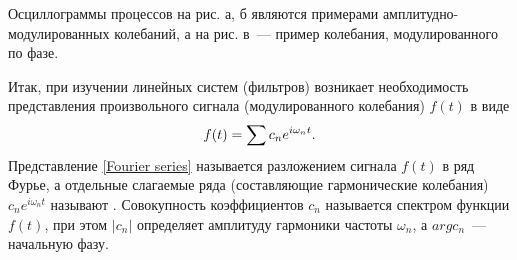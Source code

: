 




%

Осциллограммы процессов на рис. а, б являются примерами амплиту\-дно-модулированных колебаний, а на рис. в~--- пример
колебания, модулированного по фазе.



Итак, при изучении линейных систем (фильтров) возникает необходимость представления произвольного сигнала
(модулированного колебания) $f(t)$ в виде
\begin{equation}
	\eqmark{Fourier series}
	f(t)=\sum c_n e^{i\omega_n t}.
\end{equation}
Представление \eqref{Fourier series} называется разложением сигнала $f(t)$ в ряд Фурье, а отдельные слагаемые ряда (составляющие
гармонические колебания) $c_n e^{i\omega_n t}$ называют . Совокупность коэффициентов $c_n$ называется
спектром функции $f(t)$, при этом $|c_n|$ определяет амплитуду гармоники частоты $\omega_n$, а $arg c_n$~--- начальную
фазу.

